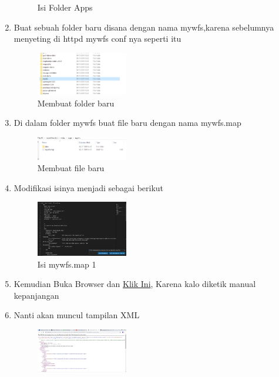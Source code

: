 \begin{enumerate}
\begin{figure}[H]
		\centering
		\caption{Isi Folder Apps}
    \end{figure}
  \item Buat sebuah folder baru disana dengan nama mywfs,karena sebelumnya menyeting di httpd mywfs conf nya seperti itu
  \hfill\break
    \begin{figure}[H]
		\includegraphics[width=4cm]{figures/1174095/4/Pengujian5.png}
		\centering
		\caption{Membuat folder baru}
    \end{figure}
  \item Di dalam folder mywfs buat file baru dengan nama mywfs.map
  \hfill\break
    \begin{figure}[H]
		\includegraphics[width=4cm]{figures/1174095/4/Pengujian6.png}
		\centering
		\caption{Membuat file baru}
    \end{figure}
  \item Modifikasi isinya menjadi sebagai berikut
  \hfill\break
    \begin{figure}[H]
		\includegraphics[width=4cm]{figures/1174095/4/Pengujian7.png}
		\centering
		\caption{Isi mywfs.map 1}
    \end{figure}
  \item Kemudian Buka Browser dan \href{http://localhost:8080/cgi-bin/mapserv.exe?map=/ms4w/apps/mywfs/mywfs.map&SERVICE=WFS&VERSION=1.0.0&REQUEST=GetCapabilities}{Klik Ini}, Karena kalo diketik manual kepanjangan
  \item Nanti akan muncul tampilan XML
  \hfill\break
    \begin{figure}[H]
		\includegraphics[width=4cm]{figures/1174095/4/Pengujian8.png}
		\centering

\end{figure}
\end{enumerate}
